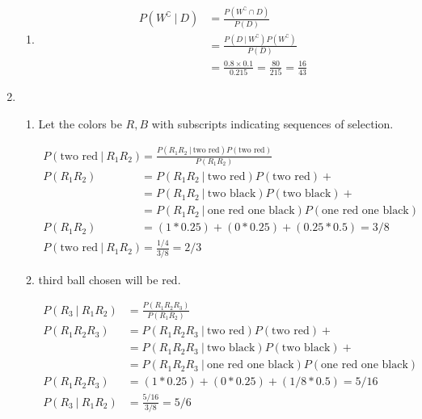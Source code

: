 \begin{enumerate}
\begin{enumerate}
		
		\item 
			\begin{align}
				P(W^\complement\ |\ D) &= \frac{P(W^\complement \cap D)}{P(D)} \\
				&= \frac{P(D\ |\ W^\complement) P(W^\complement)}{P(D)} \\
				&= \frac{0.8 \times 0.1}{0.215} = \frac{80}{215} = \frac{16}{43}
			\end{align}
		
		
	\end{enumerate}
	
	\item \begin{enumerate}
		\item Let the colors be $ R, B $ with subscripts indicating sequences of selection.
		
		
			\begin{align}
				P(\text{two red}\ |\ R_1 R_2) &= \frac{P(R_1 R_2\ |\ \text{two red}) P(\text{two red})}{P(R_1 R_2)} \\
				P(R_1 R_2) 	&= P(R_1 R_2\ |\ \text{two red}) P(\text{two red}) + \nonumber \\
				&= P(R_1 R_2\ |\ \text{two black}) P(\text{two black}) + \nonumber \\ 
				&= P(R_1 R_2\ |\ \text{one red one black}) P(\text{one red one black}) \\
				P(R_1 R_2) 	&= ( 1 * 0.25 ) + (0 * 0.25) + (0.25 * 0.5) = 3/8 \\
				P(\text{two red}\ |\ R_1 R_2) &= \frac{1/4}{3/8} = 2/3
			\end{align}
		
		
		\item third ball chosen will be red.
		
			\begin{align}
				P(R_3\ |\ R_1 R_2) &= \frac{P(R_1 R_2 R_3)}{P(R_1 R_2)} \\
				P(R_1 R_2 R_3) 	&= P(R_1 R_2 R_3\ |\ \text{two red}) P(\text{two red}) + \nonumber \\
				&= P(R_1 R_2 R_3\ |\ \text{two black}) P(\text{two black}) + \nonumber \\ 
				&= P(R_1 R_2 R_3\ |\ \text{one red one black}) P(\text{one red one black}) \\
				P(R_1 R_2 R_3) 	&= ( 1 * 0.25 ) + (0 * 0.25) + (1/8 * 0.5) = 5/16 \\
				P(R_3\ |\ R_1 R_2) &= \frac{5/16}{3/8} = 5/6
			\end{align}
		

\end{enumerate}
\end{enumerate}
